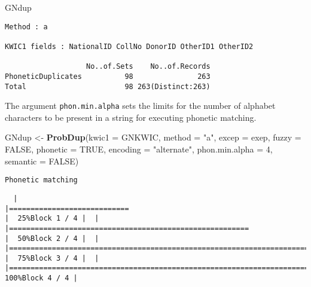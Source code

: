 \documentclass[
]{article}
\newenvironment{Shaded}{\begin{snugshade}}{\end{snugshade}}
\newcommand{\DataTypeTok}[1]{\textcolor[rgb]{0.13,0.29,0.53}{#1}}
\newcommand{\DecValTok}[1]{\textcolor[rgb]{0.00,0.00,0.81}{#1}}
\newcommand{\KeywordTok}[1]{\textcolor[rgb]{0.13,0.29,0.53}{\textbf{#1}}}
\newcommand{\NormalTok}[1]{#1}
\newcommand{\OtherTok}[1]{\textcolor[rgb]{0.56,0.35,0.01}{#1}}
\newcommand{\StringTok}[1]{\textcolor[rgb]{0.31,0.60,0.02}{#1}}
\begin{document}
\begin{Shaded}
\begin{Highlighting}[]
\NormalTok{GNdup}
\end{Highlighting}
\end{Shaded}

\begin{verbatim}
Method : a

KWIC1 fields : NationalID CollNo DonorID OtherID1 OtherID2
 
                   No..of.Sets    No..of.Records
PhoneticDuplicates          98               263
Total                       98 263(Distinct:263)
\end{verbatim}

The argument \texttt{phon.min.alpha} sets the limits for the number of
alphabet characters to be present in a string for executing phonetic
matching.

\begin{Shaded}
\begin{Highlighting}[]
\NormalTok{GNdup <-}\StringTok{ }\KeywordTok{ProbDup}\NormalTok{(}\DataTypeTok{kwic1 =}\NormalTok{ GNKWIC, }\DataTypeTok{method =} \StringTok{"a"}\NormalTok{, }\DataTypeTok{excep =}\NormalTok{ exep, }
                 \DataTypeTok{fuzzy =} \OtherTok{FALSE}\NormalTok{,}
                 \DataTypeTok{phonetic =} \OtherTok{TRUE}\NormalTok{, }\DataTypeTok{encoding =} \StringTok{"alternate"}\NormalTok{, }\DataTypeTok{phon.min.alpha =} \DecValTok{4}\NormalTok{,}
                 \DataTypeTok{semantic =} \OtherTok{FALSE}\NormalTok{)}
\end{Highlighting}
\end{Shaded}

\begin{verbatim}
Phonetic matching
\end{verbatim}

\begin{verbatim}
  |                                                                                                                       |============================                                                                                   |  25%Block 1 / 4 |  |                                                                                                                       |========================================================                                                       |  50%Block 2 / 4 |  |                                                                                                                       |===================================================================================                            |  75%Block 3 / 4 |  |                                                                                                                       |===============================================================================================================| 100%Block 4 / 4 |
\end{verbatim}
\end{document}
